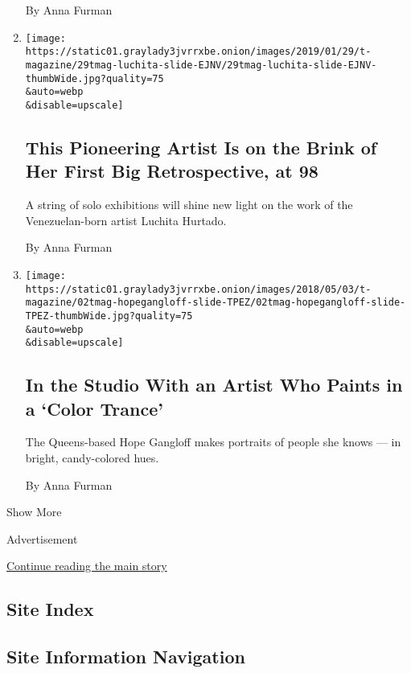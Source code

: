\begin{enumerate}
  By Anna Furman
\item
  \href{/2019/01/29/t-magazine/luchita-hurtado.html}{}

  \texttt{[image: https://static01.graylady3jvrrxbe.onion/images/2019/01/29/t-magazine/29tmag-luchita-slide-EJNV/29tmag-luchita-slide-EJNV-thumbWide.jpg?quality=75\\\&auto=webp\\\&disable=upscale]}

  \hypertarget{this-pioneering-artist-is-on-the-brink-of-her-first-big-retrospective-at-98}{%
  \subsection{This Pioneering Artist Is on the Brink of Her First Big
  Retrospective, at
  98}\label{this-pioneering-artist-is-on-the-brink-of-her-first-big-retrospective-at-98}}

  A string of solo exhibitions will shine new light on the work of the
  Venezuelan-born artist Luchita Hurtado.

  By Anna Furman
\item
  \href{/2018/05/08/t-magazine/art/hope-gangloff.html}{}

  \texttt{[image: https://static01.graylady3jvrrxbe.onion/images/2018/05/03/t-magazine/02tmag-hopegangloff-slide-TPEZ/02tmag-hopegangloff-slide-TPEZ-thumbWide.jpg?quality=75\\\&auto=webp\\\&disable=upscale]}

  \hypertarget{in-the-studio-with-an-artist-who-paints-in-a-color-trance}{%
  \subsection{In the Studio With an Artist Who Paints in a `Color
  Trance'}\label{in-the-studio-with-an-artist-who-paints-in-a-color-trance}}

  The Queens-based Hope Gangloff makes portraits of people she knows ---
  in bright, candy-colored hues.

  By Anna Furman
\end{enumerate}

Show More

Advertisement

\protect\hyperlink{after-mid2}{Continue reading the main story}

\hypertarget{site-index}{%
\subsection{Site Index}\label{site-index}}

\hypertarget{site-information-navigation}{%
\subsection{Site Information
Navigation}\label{site-information-navigation}}

